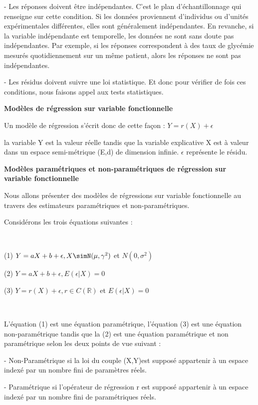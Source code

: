 \documentclass[12pt,a4paper]{article}
\newcommand{\RR}{\mathbb{R}}
\begin{document}
-	Les réponses doivent être indépendantes. C’est le plan d’échantillonnage qui renseigne sur cette condition. Si les données proviennent d’individus ou d’unités expérimentales différentes, elles sont généralement indépendantes. En revanche, si la variable indépendante est temporelle, les données ne sont sans doute pas indépendantes. Par exemple, si les réponses correspondent à des taux de glycémie mesurés quotidiennement sur un même patient, alors les réponses ne sont pas indépendantes.

-	Les résidus doivent suivre une loi statistique.
Et donc pour vérifier de fois ces conditions, nous faisons appel aux tests statistiques.

\begin{center}
\textbf{Modèles de régression sur variable fonctionnelle}
\end{center}

Un modèle de régression s'écrit donc de cette façon : 
$Y=r(X)+\epsilon$

la variable Y est la valeur réelle tandis que la variable explicative X est à valeur dans un espace semi-métrique (E,d) de dimension infinie. $\epsilon$ représente le résidu.


\begin{center}
\textbf{Modèles paramétriques et non-paramétriques de régression sur variable fonctionnelle}
\end{center}

Nous allons présenter des modèles de régressions sur variable fonctionnelle au travers des estimateurs paramétriques et non-paramétriques.

Considérons les trois équations suivantes : 

\

(1)    $Y=aX+b+\epsilon, X\simN( \mu,\gamma^2)$ et $N(0,\sigma^2)$


(2)    $Y=aX+b+\epsilon, E(\epsilon|X)=0$


(3)    $Y=r(X)+\epsilon, r\in C(\RR)$ et $E(\epsilon|X)=0$

\


L'équation (1) est une équation paramétrique, l'équation (3) est une équation non-paramétrique tandis que la (2) est une équation paramétrique et non paramétrique selon les deux points de vue suivant :

- Non-Paramétrique si la loi du couple (X,Y)est supposé appartenir à un espace indexé par un nombre fini de paramètres réels.

- Paramétrique si l'opérateur de régression r est supposé appartenir à un espace indexé par un nombre fini de paramétriques réels.
\end{document}
